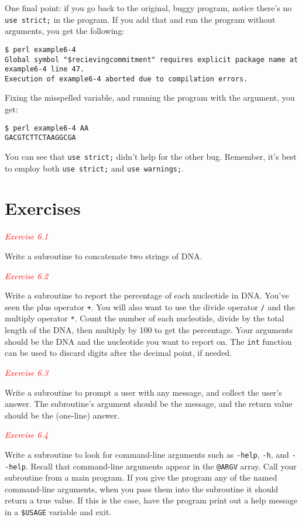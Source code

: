 One final point: if you go back to the original, buggy program, notice there's no \verb|use strict;| in the program. If you add that and run the program without arguments, you get the following: 

\begin{lstlisting}
$ perl example6-4   
Global symbol "$recievingcommitment" requires explicit package name at example6-4 line 47.
Execution of example6-4 aborted due to compilation errors.
\end{lstlisting}

Fixing the misspelled variable, and running the program with the argument, you get:

\begin{lstlisting}
$ perl example6-4 AA
GACGTCTTCTAAGGCGA
\end{lstlisting}

You can see that \verb|use strict;| didn't help for the other bug. Remember, it's best to employ both \verb|use strict;| and \verb|use warnings;|.

\section{Exercises}
\textcolor{red}{\textit{Exercise 6.1}}
\begin{adjustwidth}{2em}{}
Write a subroutine to concatenate two strings of DNA.
\end{adjustwidth}

\textcolor{red}{\textit{Exercise 6.2}}
\begin{adjustwidth}{2em}{}
Write a subroutine to report the percentage of each nucleotide in DNA. You've seen the plus operator \verb|+|. You will also want to use the divide operator \verb|/| and the multiply operator \verb|*|. Count the number of each nucleotide, divide by the total length of the DNA, then multiply by 100 to get the percentage. Your arguments should be the DNA and the nucleotide you want to report on. The \verb|int| function can be used to discard digits after the decimal point, if needed.
\end{adjustwidth}

\textcolor{red}{\textit{Exercise 6.3}}
\begin{adjustwidth}{2em}{}
Write a subroutine to prompt a user with any message, and collect the user's answer. The subroutine's argument should be the message, and the return value should be the (one-line) answer. 
\end{adjustwidth}

\textcolor{red}{\textit{Exercise 6.4}}
\begin{adjustwidth}{2em}{}
Write a subroutine to look for command-line arguments such as \verb|-help|, \verb|-h|, and \verb|--help|. Recall that command-line arguments appear in the \verb|@ARGV| array. Call your subroutine from a main program. If you give the program any of the named command-line arguments, when you pass them into the subroutine it should return a true value. If this is the case, have the program print out a help message in a \verb|$USAGE| variable and exit. 
\end{adjustwidth}

